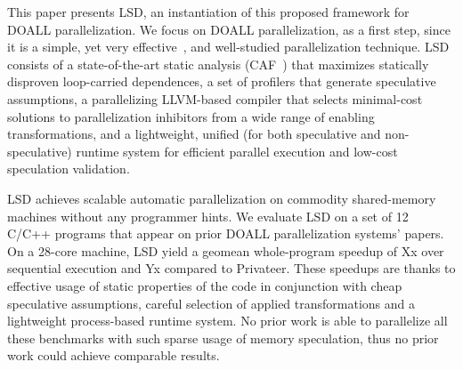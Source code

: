 This paper presents LSD, an instantiation of this proposed framework for DOALL
parallelization. We focus on DOALL parallelization, as a first step, since it is
a simple, yet very effective~\cite{zhong:08:hpca}, and well-studied
parallelization technique.
LSD consists of a state-of-the-art static analysis (CAF~\cite{..}) that
maximizes statically disproven loop-carried dependences, a set of profilers that
generate speculative assumptions, a parallelizing LLVM-based compiler that
selects minimal-cost solutions to parallelization inhibitors from a wide range
of enabling transformations, and a lightweight, unified (for both speculative
and non-speculative) runtime system for efficient parallel execution and
low-cost speculation validation.
%

LSD achieves scalable automatic parallelization on commodity shared-memory
machines without any programmer hints.  We evaluate LSD on a set of 12 C/C++
programs that appear on prior DOALL parallelization systems' papers. On a
28-core machine, LSD yield a geomean whole-program speedup of Xx over sequential
execution and Yx compared to Privateer.
These speedups are thanks to effective usage of static properties of the code in
conjunction with cheap speculative assumptions, careful selection of applied
transformations and a lightweight process-based runtime system.  No prior work
is able to parallelize all these benchmarks with such sparse usage of memory
speculation, thus no prior work could achieve comparable results.
